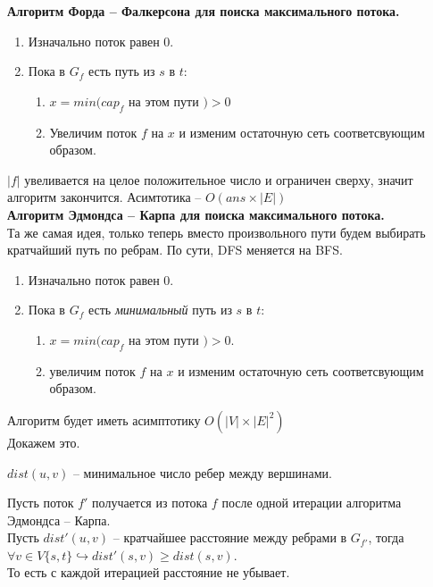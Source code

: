 \textbf{Алгоритм Форда -- Фалкерсона для поиска максимального потока.}
\begin{enumerate}
	\item Изначально поток равен 0.
	\item Пока в $G_f$ есть путь из  $s$ в  $t$:
		\begin{enumerate}
			\item $x = min(cap_f$ на этом пути  $) > 0$ 
			\item Увеличим поток $f$ на $x$ и изменим остаточную сеть соответсвующим образом.
		\end{enumerate}
\end{enumerate}
$\lvert f \rvert$ увеливается на целое положительное число и ограничен сверху, значит алгоритм закончится.
Асимтотика -- $O(ans \times \lvert E  \rvert)$  \\

\textbf{Алгоритм Эдмондса -- Карпа для поиска максимального потока.} \\
Та же самая идея, только теперь вместо произвольного пути будем выбирать кратчайший путь по ребрам. По сути, DFS меняется на BFS.
\begin{enumerate}
	\item Изначально поток равен 0.
	\item Пока в $G_f$ есть \textit{минимальный} путь из $s $ в $t$:
		\begin{enumerate}
			\item $x = min(cap_f$ на этом пути $) > 0$.
			\item  увеличим поток $f$ на  $x$  и изменим остаточную сеть соответсвующим образом.
		\end{enumerate}
\end{enumerate}

Алгоритм будет иметь асимптотику $O(\lvert V \rvert \times \lvert E \rvert ^ 2)$ \\

Докажем это.
\begin{Def}
	$dist(u, v)$ -- минимальное число ребер между вершинами.
\end{Def}

\begin{lemma}
	Пусть поток $f'$ получается из потока $f$ после одной итерации алгоритма Эдмондса -- Карпа. \\
	Пусть $dist'(u, v)$ -- кратчайшее расстояние между ребрами в $G_{f'}$, тогда
	$\forall v \in V \{s, t\} \hookrightarrow dist'(s, v) \geq dist(s, v)$.  \\
	То есть с каждой итерацией расстояние не убывает.
\end{lemma}

